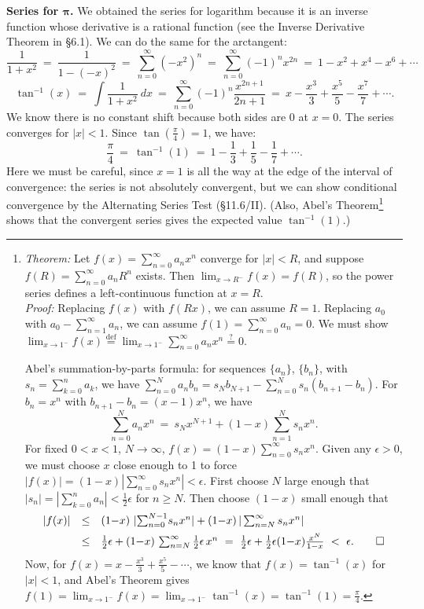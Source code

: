 \documentclass[11pt]{article}
\newcommand{\ts}{\textstyle}
\newcommand{\ep}{\epsilon}
\begin{document}
\noindent
{\bf Series for $\boldsymbol{\pi}$.}  We obtained the series for logarithm because it is an inverse function whose derivative is a rational function (see the Inverse Derivative Theorem in \S6.1). We can do the same for the arctangent:
$$
\frac1{1{+}x^2} \ =\ \frac{1}{1{-}(-x)^2}
\ =\ \sum_{n=0}^\infty (-x^2)^n\ =\ \sum_{n=0}^\infty (-1)^nx^{2n}
\ =\ 1 -x^2 + x^4 -x^6 + \cdots
$$
$$
\tan^{-1}(x) \ =\ \int\!\frac1{1{+}x^2}\ dx
\ =\ \sum_{n=0}^\infty(-1)^n\frac{x^{2n+1}}{2n{+}1}
\ =\ x -\frac{x^3}{3} +\frac{x^5}5-\frac{x^7}7+\cdots.
$$
We know there is no constant shift because both sides are 0 at $x=0$. 
The series converges for $|x|<1$.
Since $\tan(\frac\pi4) = 1$, we have:
$$
\frac{\pi}4 \ = \ \tan^{-1}(1) 
\ =\ 1 -\frac{1}{3} +\frac{1}5-\frac{1}7+\cdots.
$$
Here we must be careful, since $x=1$ is all the way at the edge 
of the interval of convergence: the series is not absolutely convergent,
but we can show conditional convergence by the Alternating Series Test (\S11.6/II).
(Also, Abel's Theorem\footnote{
{\it Theorem:} Let $f(x)=\sum_{n=0}^\infty a_n x^n$ converge for $|x|<R$,
and suppose $f(R)=\sum_{n=0}^\infty a_nR^n$ exists. Then $\lim_{x\to R^-} f(x) = f(R)$,
so the power series defines a left-continuous function at $x=R$.
\\
{\it Proof:} Replacing $f(x)$ with $f(Rx)$, we can assume $R=1$. Replacing $a_0$ with
$a_0-\sum_{n=1}^\infty a_n$, we can assume $f(1)=\sum_{n=0}^{\infty} a_n = 0$. 
We must show $\lim_{x\to 1^-} f(x) \stackrel{\text{def}}=
\lim_{x\to 1^-} \sum_{n=0}^\infty a_nx^n \stackrel?= 0$.

Abel's summation-by-parts formula: for sequences $\{a_n\}$, 
$\{b_n\}$, with $s_n=\sum_{k=0}^n a_k$, we have
 $\sum_{n=0}^N a_nb_n 
= s_N b_{N+1}  -  \sum_{n=0}^{N} s_n(b_{n+1}{-}b_n)$. 
For $b_n=x^n$ with $b_{n+1}-b_n = (x{-}1)x^n$, we have
$$\ts
\sum_{n=0}^N a_nx^n  
\ = \ s_Nx^{N+1}  +(1{-}x)\sum_{n=1}^{N} s_{n}x^n
.$$
For fixed $0<x<1$,  $N\to\infty$,
$f(x) = (1{-}x)\sum_{n=0}^{\infty} s_{n}x^n$.
Given any $\ep>0$, we must choose $x$ close enough to 1 to force 
$|f(x)| = (1{-}x) \left|\sum_{n=0}^{\infty} s_{n}x^n\right| < \ep$.
First choose $N$ large enough that 
$|s_n|=\left|\sum_{k=0}^n a_n\right|<\frac12\ep$ for $n\geq N$.
Then choose $(1{-}x)$ small enough that 
\smash{$(1{-}x)\left|\sum_{n=0}^{N-1} s_{n}x^n\right|<\frac12\ep$:}
$$\begin{array}{rcl}
|f(x)|&\leq& (1{-}x)\,\left|\smash{\sum_{n=0}^{N-1}} s_{n}x^n\right| +
(1{-}x)\, |\sum_{n=N}^{\infty} s_{n}x^n|
\\[.5em]
&\leq& \frac12\ep + (1{-}x)\,\sum_{n=N}^\infty\frac12\ep\, x^n
\ =\ \frac12\ep + \frac12\ep(1{-}x) \frac{x^N}{1-x} \ <\ \ep. \qquad\square
\end{array}$$
Now, for $f(x) = x-\frac{x^3}{3}+\frac{x^5}{5}-\cdots$, 
we know that $f(x)=\tan^{-1}(x)$ for $|x|<1$, and Abel's Theorem
gives $f(1) = \lim_{x\to1^-} f(x) = \lim_{x\to1^-} \tan^{-1}(x) = \tan^{-1}(1) =\frac\pi 4$.
}
shows that the convergent series gives the expected value $\tan^{-1}(1)$.)
\end{document}
